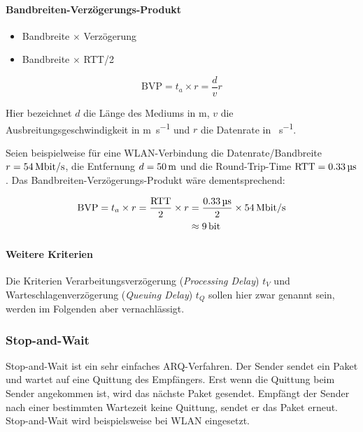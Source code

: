 \documentclass[a4paper, 14pt]{article}
\begin{document}
	\paragraph{Bandbreiten-Verzögerungs-Produkt}

	\begin{itemize}
		\item Bandbreite $\times$ Verzögerung
		\item Bandbreite $\times$ RTT/2
	\end{itemize}

	\begin{equation*}
		\text{BVP} = t_a \times r = \frac{d}{v}r
	\end{equation*}

	Hier bezeichnet $d$ die Länge des Mediums in \si{\meter}, $v$ die Ausbreitungsgeschwindigkeit in \si{\meter\per\second} und $r$ die Datenrate in \si{\bit\per\second}.

	Seien beispielweise für eine WLAN-Verbindung die Datenrate/Bandbreite $r = \text{\SI{54}{\mega\bit\per\second}}$, die Entfernung $d = \text{\SI{50}{\meter}}$ und die Round-Trip-Time $\text{RTT} = \text{\SI{0,33}{\micro\second}}$.
	Das Bandbreiten-Verzögerungs-Produkt wäre dementsprechend:

	\begin{align*}
		\text{BVP} = t_a \times r = \frac{\text{RTT}}{2} \times r &= \frac{\text{\SI{0,33}{\micro\second}}}{2} \times \text{\SI{54}{\mega\bit\per\second}} \\
		&\approx \text{\SI{9}{\bit}}
	\end{align*}

	\paragraph{Weitere Kriterien}

	Die Kriterien Verarbeitungsverzögerung (\emph{Processing Delay}) $t_V$ und Warteschlagenverzögerung (\emph{Queuing Delay}) $t_Q$ sollen hier zwar genannt sein, werden im Folgenden aber vernachlässigt.

	\subsubsection{Stop-and-Wait}

	Stop-and-Wait ist ein sehr einfaches ARQ-Verfahren.
	Der Sender sendet ein Paket und wartet auf eine Quittung des Empfängers.
	Erst wenn die Quittung beim Sender angekommen ist, wird das nächste Paket gesendet.
	Empfängt der Sender nach einer bestimmten Wartezeit keine Quittung, sendet er das Paket erneut.
	Stop-and-Wait wird beispielsweise bei WLAN eingesetzt.
\end{document}
